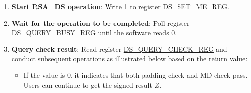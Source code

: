 \documentclass[main\_\_EN.tex]{subfiles}
\begin{document}
\begin{enumerate}
\begin{itemize}
        \item Write \begin{math}\widehat{\overline{r}}_{i}\end{math}
        (\begin{math}i \in \{ 0, 1, \dots, 95 \} \end{math})
        to \hyperref[DSRBMEM]{DS\_RB\_MEM}.
        
        \item write \begin{math}\widehat{Box}_{i}\end{math}
        (\begin{math}i \in \{ 0, 1, \dots, 11 \} \end{math})
        to \hyperref[DSBOXMEM]{DS\_BOX\_MEM}.
        
        The capacity of
        \hyperref[DSYMEM]{DS\_Y\_MEM}, 
        \hyperref[DSMMEM]{DS\_M\_MEM}, and
        \hyperref[DSRBMEM]{DS\_RB\_MEM} is 96 words, whereas the capacity of
        \hyperref[DSBOXMEM]{DS\_BOX\_MEM} is only 12 words.
        Each word can store one base-\begin{math}b\end{math} digit. The memory blocks use the little endian format for storage, i.e., the least significant digit of the operand is in the lowest address.
     
    \end{itemize}
        

    \item {\bfseries Start RSA\_DS operation}: Write 1 to register \hyperref[regdesc:DSSETMEREG]{DS\_SET\_ME\_REG}.

    \item {\bfseries Wait for the operation to be completed}: Poll register \hyperref[regdesc:DSQUERYBUSYREG]{DS\_QUERY\_BUSY\_REG} until the software reads 0.

    \item {\bfseries Query check result}: Read register \hyperref[regdesc:DSQUERYCHECKREG]{DS\_QUERY\_CHECK\_REG} and conduct subsequent operations as illustrated below based on the return value:
    
    \begin{itemize}
    
        \item If the value is 0, it indicates that both padding check and MD check pass. Users can continue to get the signed result \begin{math}Z\end{math}.
        

\end{itemize}
\end{enumerate}
\end{document}
